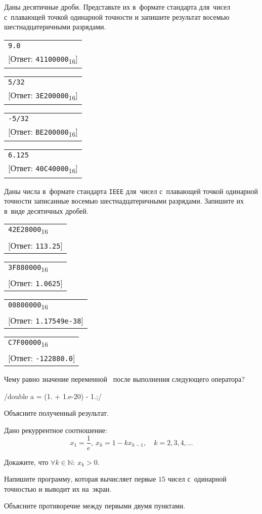 \ExercisesSection
\begin{exercise}
\newcommand{\taskcol}[2]{%
  \small%
  \begin{tabular}[t]{@{}l@{}}
  \texttt{#1} \\
  {[Ответ: \texttt{#2}\textsubscript{16}]}
  \end{tabular}%
}
\item Даны десятичные дроби. Представьте их в~формате стандарта  для~чисел с~плавающей точкой одинарной точности и запишите результат восемью шестнадцатеричными разрядами.

\smallskip
\noindent\begin{enumissue*}[itemjoin=\hfill]
  \item \taskcol  {9.0}{41100000}
  \item \taskcol {5/32}{3E200000}
  \item \taskcol{-5/32}{BE200000}
  \item \taskcol{6.125}{40C40000}
\end{enumissue*}


\renewcommand{\taskcol}[2]{%
  \small%
  \begin{tabular}[t]{@{}l@{}}
  \texttt{#1}\textsubscript{16} \\
  {[Ответ: \texttt{#2}]}
  \end{tabular}%
}
\item Даны числа в~формате стандарта \texttt{IEEE} для~чисел с~плавающей точкой одинарной точности записанные восемью шестнадцатеричными разрядами. Запишите их в~виде десятичных дробей.

\smallskip
\noindent\begin{enumissue*}[itemjoin=\hfill]
  \item \taskcol{42E28000}{113.25}
  \item \taskcol{3F880000}{1.0625}
  \item \taskcol{00800000}{1.17549e-38}
  \item \taskcol{C7F00000}{-122880.0}
\end{enumissue*}


\item Чему равно значение переменной~ после выполнения следующего оператора?

\cpp/double a = (1. + 1.e-20) - 1.;/

Объясните полученный результат.


\item Дано рекуррентное соотношение:
\[
x_1 = \frac{1}{e},~x_k = 1 - kx_{k-1},\quad k = 2, 3, 4, \ldots
\]
\begin{enumissue}
  \item\hard Докажите, что \(\forall k\in \mathbb N:~x_k > 0\).

  \item Напишите программу, которая вычисляет первые \(15\) чисел с~одинарной точностью и выводит их на~экран.

  \item Объясните противоречие между первыми двумя пунктами.
\end{enumissue}

\end{exercise}
